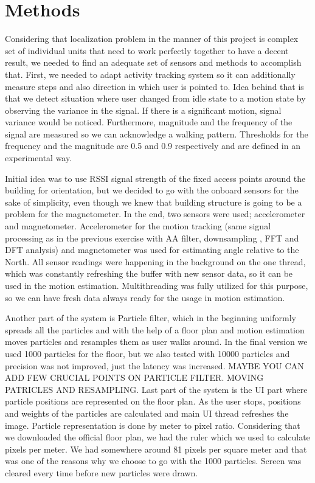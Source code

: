 \documentclass[conference]{IEEEtran}
\begin{document}
\section{Methods}
Considering that localization problem in the manner of this project is complex set of individual units that need to work perfectly together to have a decent result, we needed to find an adequate set of sensors and methods to accomplish that. First, we needed to adapt activity tracking system so it can additionally measure steps and also direction in which user is pointed to. Idea behind that is that we detect situation where user changed from idle state to a motion state by observing the variance in the signal. If there is a significant motion, signal variance would be noticed. Furthermore, magnitude and the frequency of the signal are measured so we can acknowledge a walking pattern. Thresholds for the frequency and the magnitude are 0.5 and 0.9 respectively and are defined in an experimental way. 

Initial idea was to use RSSI signal strength of the fixed access points around the building for orientation, but we decided to go with the onboard sensors for the sake of simplicity, even though we knew that building structure is going to be a problem for the magnetometer. In the end, two sensors were used; accelerometer and magnetometer. Accelerometer for the motion tracking (same signal processing as in the previous exercise with AA filter, downsampling , FFT and DFT analysis) and magnetometer was used for estimating angle relative to the North.  All sensor readings were happening in the background on the one thread, which was constantly refreshing the buffer with new sensor data, so it can be used in the motion estimation. Multithreading was fully utilized for this purpose, so we can have fresh data always ready for the usage in motion estimation. 

Another part of the system is Particle filter, which in the beginning uniformly spreads all the particles and with the help of a floor plan and motion estimation moves particles and resamples them as user walks around. In the final version we used 1000 particles for the floor, but we also tested with 10000 particles and precision was not improved, just the latency was increased.  MAYBE YOU CAN ADD FEW CRUCIAL POINTS ON PARTICLE FILTER. MOVING PATRICLES AND RESAMPLING.
Last part of the system is the UI part where particle positions are represented on the floor plan. As the user stops, positions and weights of the particles are calculated and main UI thread refreshes the image. Particle representation is done by meter to pixel ratio. Considering that we downloaded the official floor plan, we had the ruler which we used to calculate pixels per meter. We had somewhere around 81 pixels per square meter and that was one of the reasons why we choose to go with the 1000 particles. Screen was cleared every time before new particles were drawn.
\end{document}
